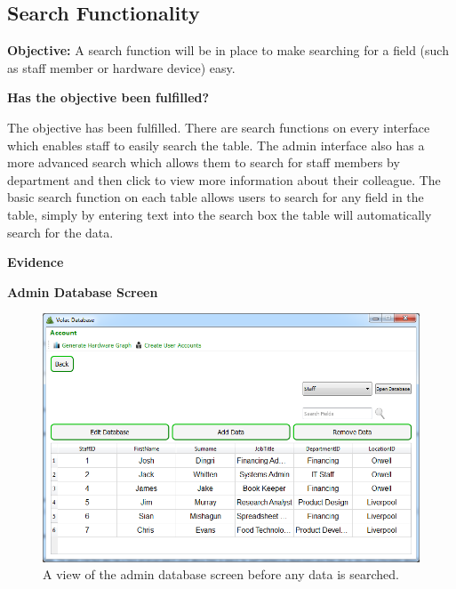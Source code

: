 \subsection{Search Functionality}\label{search}

\textbf{Objective:} A search function will be in place to make searching for a field (such as staff member or hardware device) easy.

\textbf{Has the objective been fulfilled?}

The objective has been fulfilled. There are search functions on every interface which enables staff to easily search the table. The admin interface also has a more advanced search which allows them to search for staff members by department and then click to view more information about their colleague. The basic search function on each table allows users to search for any field in the table, simply by entering text into the search box the table will automatically search for the data.

\textbf{Evidence}

\textbf{Admin Database Screen}

\begin{figure}[H]
    \includegraphics[width=\textwidth]{./Evaluation/Images/beforeadminsearch.png}
    \caption{A view of the admin database screen before any data is searched.} 
\end{figure}


